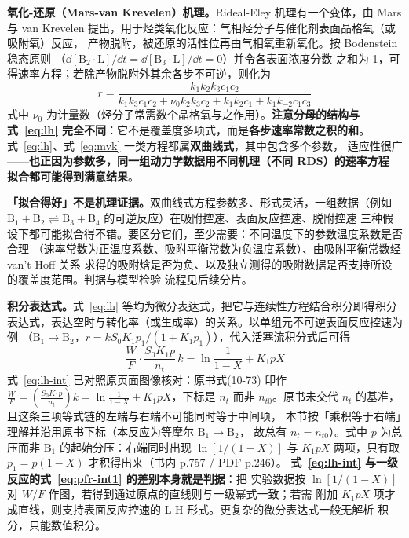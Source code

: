 \textbf{氧化-还原（Mars-van Krevelen）机理。}Rideal-Eley 机理有一个变体，由 Mars 与
van Krevelen 提出，用于烃类氧化反应：气相烃分子与催化剂表面晶格氧（或吸附氧）反应，
产物脱附，被还原的活性位再由气相氧重新氧化。按 Bodenstein 稳态原则
（$\dd[\mathrm{B_2{\cdot}L}]/\dd t=\dd[\mathrm{B_3{\cdot}L}]/\dd t=0$）并令各表面浓度分数
之和为 1，可得速率方程；若除产物脱附外其余各步不可逆，则化为
\begin{equation}
r=\frac{k_1k_2k_3c_1c_2}{k_1k_3c_1c_2+\nu_0k_2k_3c_2+k_1k_2c_1+k_1k_{-2}c_1c_3}
\label{eq:mvk}
\end{equation}
式中 $\nu_0$ 为计量数（烃分子常需数个晶格氧与之作用）。\textbf{注意分母的结构与
式~\eqref{eq:lh} 完全不同}：它不是覆盖度多项式，而是\textbf{各步速率常数之积的和}。
式~\eqref{eq:lh}、式~\eqref{eq:mvk} 一类方程都属\textbf{双曲线式}，其中包含多个参数，
适应性很广——\textbf{也正因为参数多，同一组动力学数据用不同机理（不同 RDS）的速率方程
拟合都可能得到满意结果}。

\begin{pitfall}
\textbf{「拟合得好」不是机理证据。}双曲线式方程参数多、形式灵活，一组数据（例如
$\mathrm{B_1+B_2\rightleftharpoons B_3+B_4}$ 的可逆反应）在吸附控速、表面反应控速、脱附控速
三种假设下都可能拟合得不错。要区分它们，至少需要：不同温度下的参数温度系数是否合理
（速率常数为正温度系数、吸附平衡常数为负温度系数）、由吸附平衡常数经 van't Hoff 关系
求得的吸附焓是否为负、以及独立测得的吸附数据是否支持所设的覆盖度范围。判据与模型检验
流程见后续分片。
\end{pitfall}

\textbf{积分表达式。}式~\eqref{eq:lh} 等均为微分表达式，把它与连续性方程结合积分即得积分
表达式，表达空时与转化率（或生成率）的关系。以单组元不可逆表面反应控速为例
（$\mathrm{B_1}\to\mathrm{B_2}$，$r=kS_0K_1p_1/(1+K_1p_1)$），代入活塞流积分式后可得
\begin{equation}
\frac{W}{F}\cdot\frac{S_0K_1p}{n_{\mathrm t}}\,k
=\ln\frac{1}{1-X}+K_1pX
\label{eq:lh-int}
\end{equation}
式~\eqref{eq:lh-int} 已对照原页面图像核对：原书式(10-73) 印作
$\frac{W}{F}=\left(\frac{S_0K_1p}{n_t}\right)k=\ln\frac{1}{1-X}+K_1pX$，下标是 $n_t$ 而非
$n_{t0}$。原书未交代 $n_t$ 的基准，且这条三项等式链的左端与右端不可能同时等于中间项，
本节按「乘积等于右端」理解并沿用原书下标（本反应为等摩尔 $\mathrm{B_1}\to\mathrm{B_2}$，
故总有 $n_t=n_{t0}$）。式中 $p$ 为总压而非 $\mathrm{B_1}$ 的起始分压：右端同时出现
$\ln[1/(1-X)]$ 与 $K_1pX$ 两项，只有取 $p_1=p(1-X)$ 才积得出来（书内 p.757 / PDF p.246）。
\textbf{式~\eqref{eq:lh-int} 与一级反应的式~\eqref{eq:pfr-int1} 的差别本身就是判据}：把
实验数据按 $\ln[1/(1-X)]$ 对 $W/F$ 作图，若得到通过原点的直线则与一级幂式一致；若需
附加 $K_1pX$ 项才成直线，则支持表面反应控速的 L-H 形式。更复杂的微分表达式一般无解析
积分，只能数值积分。

